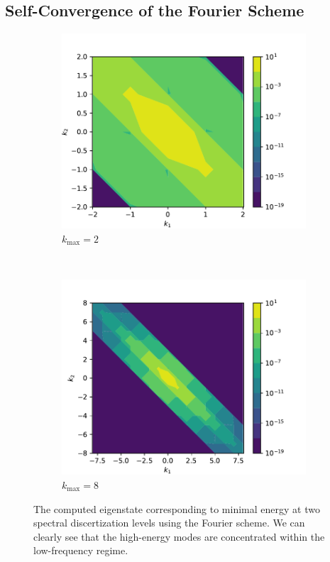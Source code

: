 \documentclass{amsart}
\begin{document}
\subsection{Self-Convergence of the Fourier Scheme}

\begin{figure}
  \centering
  \begin{subfigure}{0.48\textwidth}
    \centering
    \includegraphics[width=\textwidth]{figures/2d_fourier_self_convergence_state_2.pdf}
    \caption{$k_\text{max} = 2$}
  \end{subfigure}
  ~
  \begin{subfigure}{0.48\textwidth}
    \centering
    \includegraphics[width=\textwidth]{figures/2d_fourier_self_convergence_state_8.pdf}
    \caption{$k_\text{max} = 8$}
  \end{subfigure}
  \caption{The computed eigenstate corresponding to minimal energy at two
  spectral discertization levels using the Fourier scheme. We can clearly see
  that the high-energy modes are concentrated within the low-frequency regime.}
  \label{fig:2d-fourier-self-convergence-solution}
\end{figure}
\end{document}
